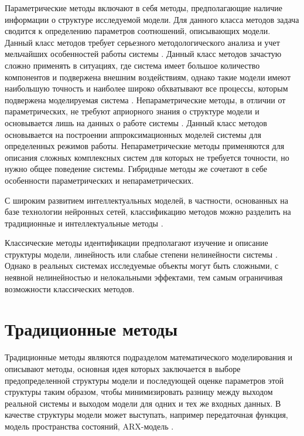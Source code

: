 Параметрические методы включают в себя методы, предполагающие наличие информации
о структуре исследуемой модели. Для данного класса методов задача сводится к
определению параметров соотношений, описывающих модели. Данный класс методов
требует серьезного методологического анализа и учет мельчайших особенностей
работы системы \cite{bib:ident:simulation}. Данный класс методов зачастую сложно
применять в ситуациях, где система имеет большое количество компонентов и
подвержена внешним воздействиям, однако такие модели имеют наибольшую точность и
наиболее широко обхватывают все процессы, которым подвержена моделируемая
система \cite{bib:ident:model:klassif}. Непараметрические методы, в отличии от
параметрических, не требуют априорного знания о структуре модели и основывается
лишь на данных о работе системы \cite{bib:ident:arrays}. Данный класс методов
основывается на построении аппроксимационных моделей системы для определенных
режимов работы. Непараметрические методы применяются для описания сложных
комплексных систем для которых не требуется точности, но нужно общее поведение
системы. Гибридные методы же сочетают в себе особенности параметрических и
непараметрических. 

С широким развитием интеллектуальных моделей, в частности, основанных на базе
технологии нейронных сетей, классификацию методов можно разделить на
традиционные и интеллектуальные методы \cite{bib:ident:neural:modelling}.

Классические методы идентификации предполагают изучение и описание структуры
модели, линейность или слабые степени нелинейности системы
\cite{bib:sim:topic-based}. Однако в реальных системах исследуемые объекты могут
быть сложными, с неявной нелинейностью и нелокальными эффектами, тем самым
ограничивая возможности классических методов. 

\section{Традиционные методы}

Традиционные методы являются подразделом математического моделирования и
описывают методы, основная идея которых заключается в выборе предопределенной
структуры модели и последующей оценке параметров этой структуры таким образом,
чтобы минимизировать разницу между выходом реальной системы и выходом модели для
одних и тех же входных данных. В качестве структуры модели может выступать,
например передаточная функция, модель пространства состояний, ARX-модель
. 

